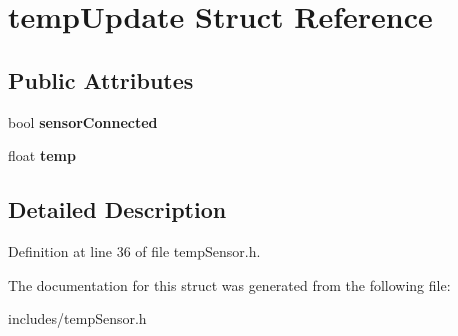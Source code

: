 \hypertarget{structtempUpdate}{}\section{temp\+Update Struct Reference}
\label{structtempUpdate}
\subsection*{Public Attributes}
\begin{DoxyCompactItemize}
\item 
\mbox{\label{structtempUpdate_acceab45fa64ed026d0553f29db96b275}} 
bool {\bfseries sensor\+Connected}
\item 
\mbox{\label{structtempUpdate_a9925c0410765ae18b055fe6e8628e854}} 
float {\bfseries temp}
\end{DoxyCompactItemize}


\subsection{Detailed Description}


Definition at line 36 of file temp\+Sensor.\+h.



The documentation for this struct was generated from the following file\+:\begin{DoxyCompactItemize}
\item 
includes/temp\+Sensor.\+h\end{DoxyCompactItemize}
